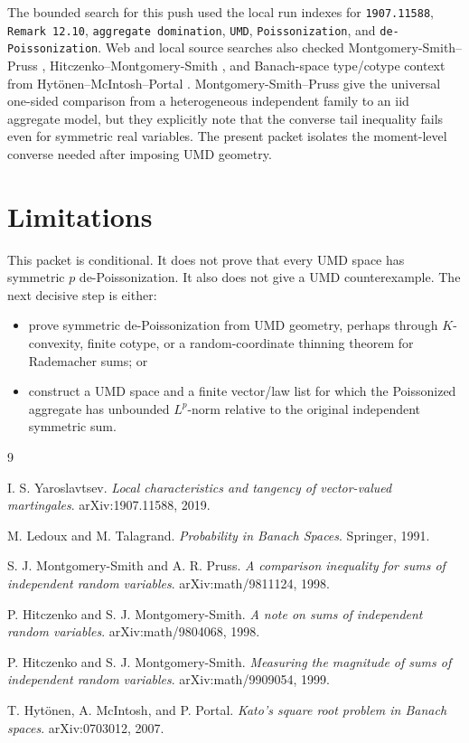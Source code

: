 \documentclass[11pt]{article}
\begin{document}
The bounded search for this push used the local run indexes for
\texttt{1907.11588}, \texttt{Remark 12.10}, \texttt{aggregate domination},
\texttt{UMD}, \texttt{Poissonization}, and \texttt{de-Poissonization}.  Web
and local source searches also checked Montgomery-Smith--Pruss
\cite{MontgomerySmithPruss}, Hitczenko--Montgomery-Smith
\cite{HitczenkoMontgomerySmithNote,HitczenkoMontgomerySmithMagnitude}, and
Banach-space type/cotype context from Hyt\"onen--McIntosh--Portal
\cite{HytonenMcIntoshPortal}.  Montgomery-Smith--Pruss give the universal
one-sided comparison from a heterogeneous independent family to an iid
aggregate model, but they explicitly note that the converse tail inequality
fails even for symmetric real variables.  The present packet isolates the
moment-level converse needed after imposing UMD geometry.

\section*{Limitations}

This packet is conditional.  It does not prove that every UMD space has
symmetric \(p\) de-Poissonization.  It also does not give a UMD
counterexample.  The next decisive step is either:
\begin{itemize}
\item prove symmetric de-Poissonization from UMD geometry, perhaps through
      \(K\)-convexity, finite cotype, or a random-coordinate thinning theorem
      for Rademacher sums; or
\item construct a UMD space and a finite vector/law list for which the
      Poissonized aggregate has unbounded \(L^p\)-norm relative to the original
      independent symmetric sum.
\end{itemize}

\begin{thebibliography}{9}

I. S. Yaroslavtsev.
\newblock \emph{Local characteristics and tangency of vector-valued martingales}.
\newblock arXiv:1907.11588, 2019.

M. Ledoux and M. Talagrand.
\newblock \emph{Probability in Banach Spaces}.
\newblock Springer, 1991.

S. J. Montgomery-Smith and A. R. Pruss.
\newblock \emph{A comparison inequality for sums of independent random variables}.
\newblock arXiv:math/9811124, 1998.

P. Hitczenko and S. J. Montgomery-Smith.
\newblock \emph{A note on sums of independent random variables}.
\newblock arXiv:math/9804068, 1998.

P. Hitczenko and S. J. Montgomery-Smith.
\newblock \emph{Measuring the magnitude of sums of independent random variables}.
\newblock arXiv:math/9909054, 1999.

T. Hyt\"onen, A. McIntosh, and P. Portal.
\newblock \emph{Kato's square root problem in Banach spaces}.
\newblock arXiv:0703012, 2007.

\end{thebibliography}
\end{document}
